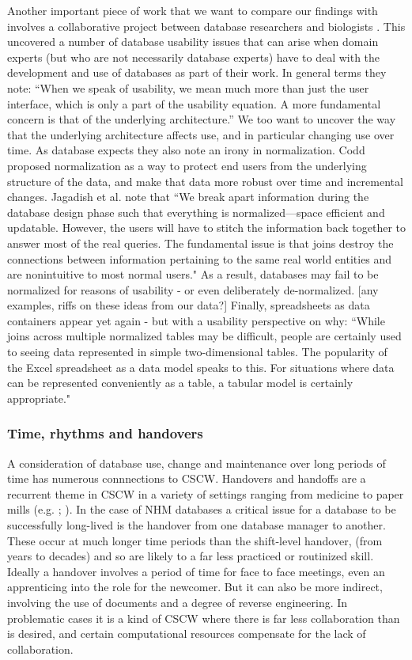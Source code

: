 Another important piece of work that we want to compare our findings with involves a collaborative project between database researchers and biologists   \cite{jagadish2007making}. This uncovered a number of database usability issues that can arise when domain experts (but who are not necessarily database experts) have to deal with the development and use of databases as part of their work. In general terms they note: “When we speak of usability, we mean much more than just the user interface, which is only a part of the usability equation. A more fundamental concern is that of the underlying architecture.” We too want to uncover the way that the underlying architecture affects use, and in particular changing use over time. As database expects they also note an irony in normalization. Codd proposed normalization as a way to protect end users from the underlying structure of the data, and make that data more robust over time and incremental changes. Jagadish et al. note that “We break apart information during the database design phase such that everything is normalized—space efficient and updatable. However, the users will have to stitch the information back together to answer most of the real queries. The fundamental issue is that joins destroy the connections between information pertaining to the same real world entities and are nonintuitive to most normal users." As a result, databases may fail to be normalized for reasons of usability - or even deliberately de-normalized. [any examples, riffs on these ideas from our data?] Finally, spreadsheets as data containers appear yet again - but with a usability perspective on why: “While joins across multiple normalized tables may be difficult, people are certainly used to seeing data represented in simple two-dimensional tables. The popularity of the Excel spreadsheet as a data model speaks to this. For situations where data can be represented conveniently as a table, a tabular model is certainly appropriate."

\subsubsection{Time, rhythms and handovers}

A consideration of database use, change and maintenance over long periods of time has numerous connnections to CSCW. Handovers and handoffs are a recurrent theme in CSCW in a variety of settings ranging from medicine to paper mills (e.g. \cite{sarcevic2009information};  \cite{auramaki1996paperwork}). In the case of NHM databases a critical issue for a database to be successfully long-lived is the handover from one database manager to another. These occur at much longer time periods than the shift-level handover, (from years to decades) and so are likely to a far less practiced or routinized skill. Ideally a handover involves a period of time for face to face meetings, even an apprenticing into the role for the newcomer. But it can also be more indirect, involving the use of documents and a degree of reverse engineering. In problematic cases it is a kind of CSCW where there is far less collaboration than is desired, and certain computational resources compensate for the lack of collaboration. 

